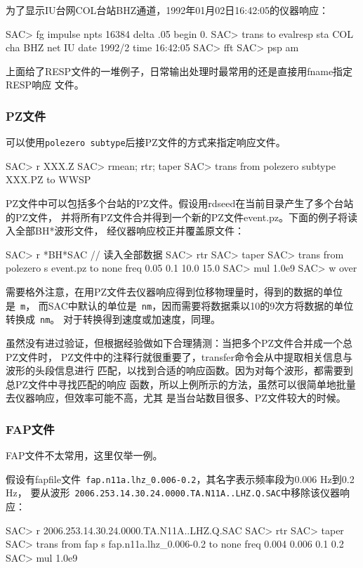 为了显示IU台网COL台站BHZ通道，1992年01月02日16:42:05的仪器响应：
\begin{SACCode}
SAC> fg impulse npts 16384 delta .05 begin 0.
SAC> trans to evalresp sta COL cha BHZ net IU date 1992/2 time 16:42:05
SAC> fft
SAC> psp am
\end{SACCode}

上面给了RESP文件的一堆例子，日常输出处理时最常用的还是直接用fname指定RESP响应
文件。

\subsubsection{PZ文件}
可以使用\verb+polezero subtype+后接PZ文件的方式来指定响应文件。
\begin{SACCode}
SAC> r XXX.Z
SAC> rmean; rtr; taper
SAC> trans from polezero subtype XXX.PZ to WWSP
\end{SACCode}

PZ文件中可以包括多个台站的PZ文件。假设用rdseed在当前目录产生了多个台站的PZ文件，
并将所有PZ文件合并得到一个新的PZ文件event.pz。下面的例子将读入全部BH*波形文件，
经仪器响应校正并覆盖原文件：
\begin{SACCode}
SAC> r *BH*SAC          // 读入全部数据
SAC> rtr
SAC> taper
SAC> trans from polezero s event.pz to none freq 0.05 0.1 10.0 15.0
SAC> mul 1.0e9
SAC> w over
\end{SACCode}

需要格外注意，在用PZ文件去仪器响应得到位移物理量时，得到的数据的单位是~\verb+m+，
而SAC中默认的单位是~\verb+nm+，因而需要将数据乘以10的9次方将数据的单位转换成~\verb+nm+。
对于转换得到速度或加速度，同理。

虽然没有进过验证，但根据经验做如下合理猜测：当把多个PZ文件合并成一个总PZ文件时，
PZ文件中的注释行就很重要了，transfer命令会从中提取相关信息与波形的头段信息进行
匹配，以找到合适的响应函数。因为对每个波形，都需要到总PZ文件中寻找匹配的响应
函数，所以上例所示的方法，虽然可以很简单地批量去仪器响应，但效率可能不高，尤其
是当台站数目很多、PZ文件较大的时候。

\subsubsection{FAP文件}
FAP文件不太常用，这里仅举一例。

假设有fapfile文件~\verb+fap.n11a.lhz_0.006-0.2+，其名字表示频率段为0.006 Hz到0.2 Hz，
要从波形~\verb+2006.253.14.30.24.0000.TA.N11A..LHZ.Q.SAC+中移除该仪器响应：
\begin{SACCode}
SAC> r 2006.253.14.30.24.0000.TA.N11A..LHZ.Q.SAC
SAC> rtr
SAC> taper
SAC> trans from fap s fap.n11a.lhz_0.006-0.2 to none freq 0.004 0.006 0.1 0.2
SAC> mul 1.0e9
\end{SACCode}
